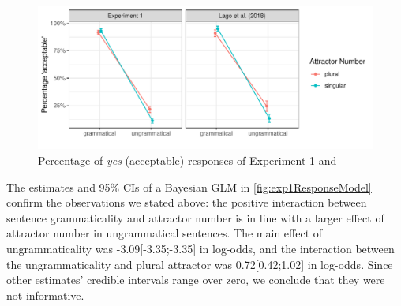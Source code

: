 \documentclass[doc,a4paper,man,natbib,floatsintext,noextraspace]{apa6}\usepackage[]{graphicx}\usepackage[]{color}
\makeatletter
\def\maxwidth{ %
  \ifdim\Gin@nat@width>\linewidth
    \linewidth
  \else
    \Gin@nat@width
  \fi
}
\newenvironment{knitrout}{}{} %
\makeatother
\begin{document}
\begin{knitrout}
\color{fgcolor}\begin{figure}

{\centering \includegraphics[width=\maxwidth]{figure/exp1AvgResponse-1} 

}

\caption{Percentage of \emph{yes} (acceptable) responses of Experiment 1 and \citet{LagoEtAl:2018}}\label{fig:exp1AvgResponse}
\end{figure}


\end{knitrout}



The estimates and 95\% CIs of a Bayesian GLM in \autoref{fig:exp1ResponseModel} confirm the observations we stated above: the positive interaction between sentence grammaticality and attractor number is in line with a larger effect of attractor number in ungrammatical sentences. The main effect of ungrammaticality was -3.09[-3.35;-3.35] in log-odds, and the interaction between the ungrammaticality and plural attractor was 0.72[0.42;1.02] in log-odds. Since other estimates' credible intervals range over zero, we conclude that they were not informative. %

\end{document}

